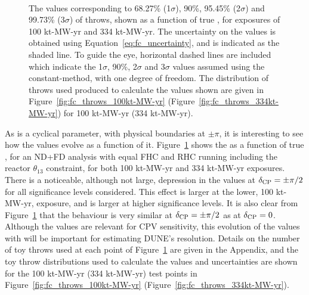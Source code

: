 \begin{figure}[htbp]
  \centering
  \\
  \caption{The \dchisqcrit values corresponding to 68.27\% (1$\sigma$), 90\%, 95.45\% (2$\sigma$) and 99.73\% (3$\sigma$) of throws, shown as a function of true \deltacp, for exposures of 100 kt-MW-yr and 334 kt-MW-yr. The uncertainty on the \dchisqcrit values is obtained using Equation~\ref{eq:fc_uncertainty}, and is indicated as the shaded line. To guide the eye, horizontal dashed lines are included which indicate the 1$\sigma$, 90\%, 2$\sigma$ and 3$\sigma$ \dchisqCPV values assumed using the constant-\dchisq method, with one degree of freedom. The distribution of throws used produced to calculate the \dchisqcrit values shown are given in Figure~\ref{fig:fc_throws_100kt-MW-yr} (Figure~\ref{fig:fc_throws_334kt-MW-yr}) for 100 kt-MW-yr (334 kt-MW-yr).}
  \label{fig:fc_vs_dcp}
\end{figure}
As \deltacp is a cyclical parameter, with physical boundaries at $\pm\pi$, it is interesting to see how the \dchisqcrit values evolve as a function of it. Figure~\ref{fig:fc_vs_dcp} shows the \dchisqcrit as a function of true \deltacp, for an ND+FD analysis with equal FHC and RHC running including the reactor $\theta_{13}$ constraint, for both 100 kt-MW-yr and 334 kt-MW-yr exposures. There is a noticeable, although not large, depression in the \dchisqcrit values at $\delta_{\rm CP} = \pm\pi/2$ for all significance levels considered. This effect is larger at the lower, 100 kt-MW-yr, exposure, and is larger at higher significance levels. It is also clear from Figure~\ref{fig:fc_vs_dcp} that the \dchisqcrit behaviour is very similar at $\delta_{\rm CP} = \pm\pi/2$ as at $\delta_{\rm CP} = 0$. Although the \dchisqcrit values are relevant for CPV sensitivity, this evolution of the \dchisqcrit values with \deltacp will be important for estimating DUNE's \deltacp resolution. Details on the number of toy throws used at each point of Figure~\ref{fig:fc_vs_dcp} are given in the Appendix, and the toy throw distributions used to calculate the \dchisqcrit values and uncertainties are shown for the 100 kt-MW-yr (334 kt-MW-yr) test points in Figure~\ref{fig:fc_throws_100kt-MW-yr} (Figure~\ref{fig:fc_throws_334kt-MW-yr}).

